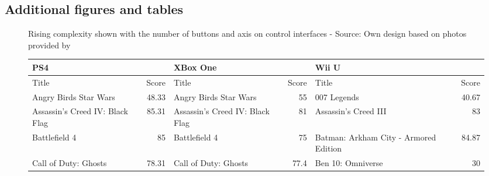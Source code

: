 \documentclass
[
    a4paper,
    11pt
]
{article}
\begin{document}
\cleardoublepage

\renewcommand\bibname{References}

\clearpage
%
\begin{appendix}
\section{Additional figures and tables}
\label{app:figures}
\singlespacing
%
\begin{figure}[h]
  \centering
      \caption{Rising complexity shown with the number of buttons and axis on control interfaces - Source: Own design based on photos provided by \cite{Brunner2013}}
      \label{fig:buttons}
\end{figure}
%
\begin{figure}
    \centering
    \small
    \begin{tabular}{ | p{3.5cm} | r | p{3.5cm} | r | p{3.5cm} | r |}\hline
		PS4&&XBox One&&Wii U&\\ \hline \hline
		Title&Score&Title&Score&Title&Score\\ \hline
		Angry Birds Star Wars&48.33&Angry Birds Star Wars&55&007 Legends&40.67\\ \hline
		Assassin's Creed IV: Black Flag&85.31&Assassin's Creed IV: Black Flag&81&Assassin's Creed III&83\\ \hline
		Battlefield 4&85&Battlefield 4&75&Batman: Arkham City - Armored Edition&84.87\\ \hline
		Call of Duty: Ghosts&78.31&Call of Duty: Ghosts&77.4&Ben 10: Omniverse&30\\ \hline

\end{tabular}
\end{figure}
\end{appendix}
\end{document}
